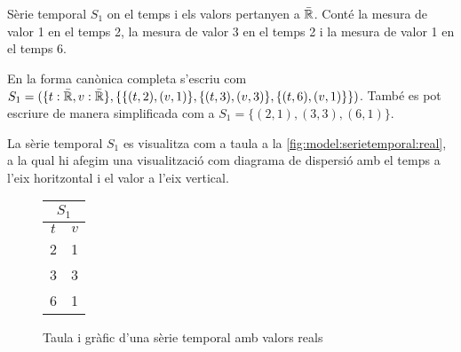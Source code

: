 \begin{example}
  Sèrie temporal $S_1$ on el temps i els valors pertanyen a
  $\bar{\mathbb{R}{}}$. Conté la mesura de valor 1 en el temps 2, la mesura de
  valor 3 en el temps 2 i la mesura de valor 1 en el temps 6.

En la forma canònica completa s'escriu com $S_1 = ( \{t:
\bar{\mathbb{R}{}}, v: \bar{\mathbb{R}{}}\}, \{ \{(t,2),(v,1)\}, \{(t,3),(v,3)\},
\{(t,6),(v,1)\} \} )$. També es pot escriure de manera simplificada com a
$S_1 = \{ (2,1), (3,3), (6,1) \}$.


La sèrie temporal $S_1$ es visualitza com a taula a la
\autoref{fig:model:serietemporal:real}, a la qual hi afegim una
visualització com diagrama de dispersió amb el temps a l'eix
horitzontal i el valor a l'eix vertical.

\begin{figure}[tp]
  \centering
  \begin{tabular}[c]{|c|c|}
    \multicolumn{2}{c}{$S_1$} \\ \hline
    $t$  & $v$ \\ \hline
    2  & 1 \\
    3  & 3 \\
    6  & 1 \\ \hline
  \end{tabular} \qquad
  \caption{Taula i gràfic d'una sèrie temporal amb valors reals}
  \label{fig:model:serietemporal:real}
\end{figure}
 
\end{example}


